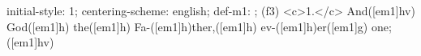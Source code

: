 initial-style: 1;
centering-scheme: english;
def-m1: \grealign;
(f3) <c>1.</c> And([em1]hv) God([em1]h) the([em1]h) Fa-([em1]h)ther,([em1]h) ev-([em1]h)er([em1]g) one;([em1]hv)
